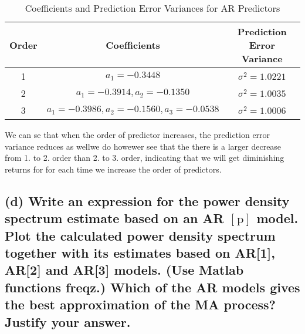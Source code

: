 \begin{table}[H]
    \centering
    \begin{tabular}{c c c}
    \hline
    Order & Coefficients & Prediction Error Variance \\
    \hline
    1 & $a_1 = -0.3448$ & $\sigma^2 = 1.0221$ \\
    2 & $a_1 = -0.3914, a_2 = -0.1350$ & $\sigma^2 = 1.0035$ \\
    3 & $a_1 = -0.3986, a_2 = -0.1560, a_3 = -0.0538$ & $\sigma^2 = 1.0006$ \\
    \hline
    \end{tabular}
    \caption{Coefficients and Prediction Error Variances for AR Predictors}
    \label{table:ar_predictors}
    \end{table}

We can se that when the order of predictor increases, the prediction error variance reduces as wellwe do howewer see that the there is a larger decrease from 1. to 2. order than 2. to 3. order, indicating that we will get diminishing returns for for each time we increase the order of predictors.

\subsection*{(d) Write an expression for the power density spectrum estimate based on an AR $[\mathrm{p}]$ model.
Plot the calculated power density spectrum together with its estimates based on AR[1], AR[2] and AR[3] models. (Use Matlab functions freqz.)
Which of the AR models gives the best approximation of the MA process? Justify your answer.}